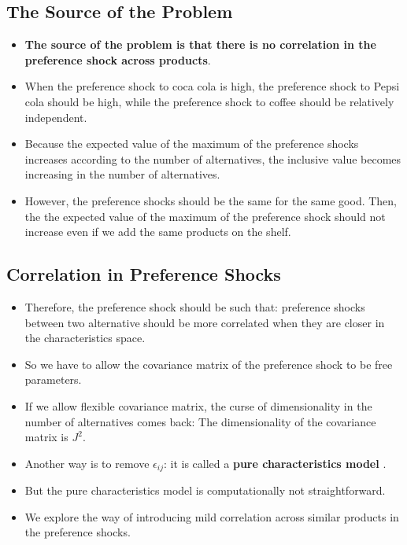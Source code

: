 \documentclass[
]{book}
\providecommand{\tightlist}{%
  \setlength{\itemsep}{0pt}\setlength{\parskip}{0pt}}
\begin{document}
\hypertarget{the-source-of-the-problem}{%
\subsection{The Source of the Problem}\label{the-source-of-the-problem}}

\begin{itemize}
\tightlist
\item
  \textbf{The source of the problem is that there is no correlation in the preference shock across products}.
\item
  When the preference shock to coca cola is high, the preference shock to Pepsi cola should be high, while the preference shock to coffee should be relatively independent.
\item
  Because the expected value of the maximum of the preference shocks increases according to the number of alternatives, the inclusive value becomes increasing in the number of alternatives.
\item
  However, the preference shocks should be the same for the same good. Then, the the expected value of the maximum of the preference shock should not increase even if we add the same products on the shelf.
\end{itemize}

\hypertarget{correlation-in-preference-shocks}{%
\subsection{Correlation in Preference Shocks}\label{correlation-in-preference-shocks}}

\begin{itemize}
\tightlist
\item
  Therefore, the preference shock should be such that: preference shocks between two alternative should be more correlated when they are closer in the characteristics space.
\item
  So we have to allow the covariance matrix of the preference shock to be free parameters.
\item
  If we allow flexible covariance matrix, the curse of dimensionality in the number of alternatives comes back: The dimensionality of the covariance matrix is \(J^2\).
\item
  Another way is to remove \(\epsilon_{ij}\): it is called a \textbf{pure characteristics model} \citep{Berry2007}.
\item
  But the pure characteristics model is computationally not straightforward.
\item
  We explore the way of introducing mild correlation across similar products in the preference shocks.
\end{itemize}
\end{document}
